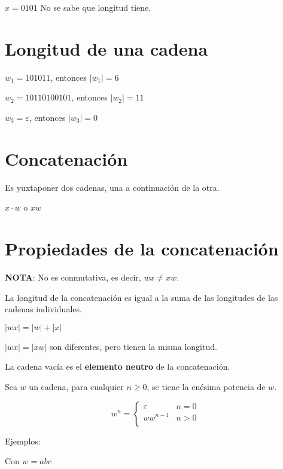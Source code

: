 \documentclass{article}
\begin{document}
$x = 0101$ No se sabe que longitud tiene.

\section{Longitud de una cadena}

$w_1 = 101011$, entonces $|w_1| = 6$

$w_2 = 10110100101$, entonces $|w_2| = 11$

$w_3 = \varepsilon$, entonces $|w_3| = 0$

\section{Concatenación}

Es yuxtaponer dos cadenas, una a continuación de la otra.

$x \cdot w$ o $xw$

\section{Propiedades de la concatenación}

\textbf{NOTA}: No es conmutativa, es decir, $wx \ne xw$.
\vspace{1em}

La longitud de la concatenación es igual a la suma de las longitudes de las
cadenas individuales.
\vspace{1em}

$|wx| = |w| + |x|$

$|wx| = |xw|$ son diferentes, pero tienen la misma longitud.
\vspace{1em}

La cadena vacía es el \textbf{elemento neutro} de la concatenación.
\vspace{1em}

Sea $w$ un cadena, para cualquier $n \ge 0$, se tiene la enésima potencia
de $w$.

\begin{equation*}
    w^n = \begin{cases}
    \varepsilon & n = 0\\
    ww^{n-1} & n > 0\\
    \end{cases}
\end{equation*}

Ejemplos:
\vspace{1em}

Con $w = abc$
\vspace{1em}
\end{document}
